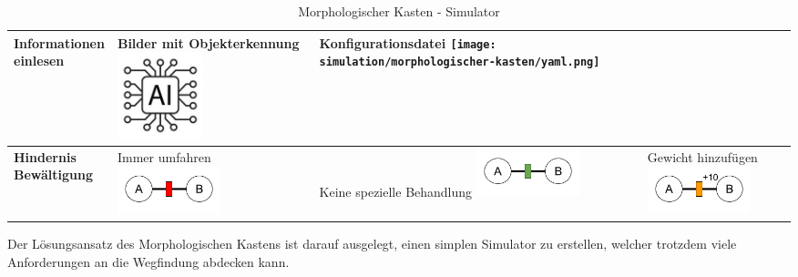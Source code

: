 \documentclass[../main.tex]{subfiles}
\begin{document}
\begin{table}[htbp!]
\begin{tabularx}{\textwidth}{| X | Y | Y | Y |}
        \textbf{Informationen \newline einlesen}  &     
        Bilder mit Objekterkennung \newline
        \includegraphics[width=2.5cm]{img/simulation/morphologischer-kasten/ai-logo.jpg}
        &
        Konfigurationsdatei \newline
        \texttt{[image: simulation/morphologischer-kasten/yaml.png]}
        &
        \\ \hline
        
        \textbf{Hindernis \newline Bewältigung}   &     
        Immer umfahren \newline
        \includegraphics[width=3cm]{img/simulation/morphologischer-kasten/hindernis-umfahren.png}
        &
        Keine spezielle Behandlung \newline
        \includegraphics[width=3cm]{img/simulation/morphologischer-kasten/hindernis-ignoriert.png}
        &
        Gewicht hinzufügen\newline
        \includegraphics[width=3cm]{img/simulation/morphologischer-kasten/hindernis-gewicht.png}
        \\ \hline
    \end{tabularx}
    \caption{Morphologischer Kasten - Simulator}
\end{table}

Der Lösungsansatz des Morphologischen Kastens ist darauf ausgelegt, einen simplen Simulator zu erstellen, welcher trotzdem viele Anforderungen an die Wegfindung abdecken kann.
\end{document}
